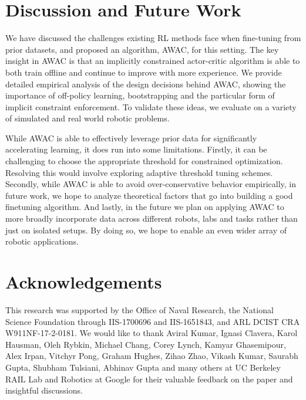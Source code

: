 \documentclass[conference]{IEEEtran}
\begin{document}
\section{Discussion and Future Work}\label{sec:conclusion}

We have discussed the challenges existing RL methods face when fine-tuning from prior datasets, and proposed an algorithm, AWAC, for this setting. The key insight in AWAC is that an implicitly constrained actor-critic algorithm is able to both train offline and continue to improve with more experience. We provide detailed empirical analysis of the design decisions behind AWAC, showing the importance of off-policy learning, bootstrapping and the particular form of implicit constraint enforcement. To validate these ideas, we evaluate on a variety of simulated and real world robotic problems. 

While AWAC is able to effectively leverage prior data for significantly accelerating learning, it does run into some limitations. Firstly, it can be challenging to choose the appropriate threshold for constrained optimization. Resolving this would involve exploring adaptive threshold tuning schemes. Secondly, while AWAC is able to avoid over-conservative behavior empirically, in future work, we hope to analyze theoretical factors that go into building a good finetuning algorithm. And lastly, in the future we plan on applying AWAC to more broadly incorporate data across different robots, labs and tasks rather than just on isolated setups. By doing so, we hope to enable an even wider array of robotic applications.

\section{Acknowledgements}
This research was supported by the Office of Naval Research, the National Science Foundation through IIS-1700696 and IIS-1651843, and ARL DCIST CRA W911NF-17-2-0181. We would like to thank Aviral Kumar, Ignasi Clavera, Karol Hausman, Oleh Rybkin, Michael Chang, Corey Lynch, Kamyar Ghasemipour, Alex Irpan, Vitchyr Pong, Graham Hughes, Zihao Zhao, Vikash Kumar, Saurabh Gupta, Shubham Tulsiani, Abhinav Gupta and many others at UC Berkeley RAIL Lab and Robotics at Google for their valuable feedback on the paper and insightful discussions.

\raggedbottom




\clearpage
\newpage
\end{document}
